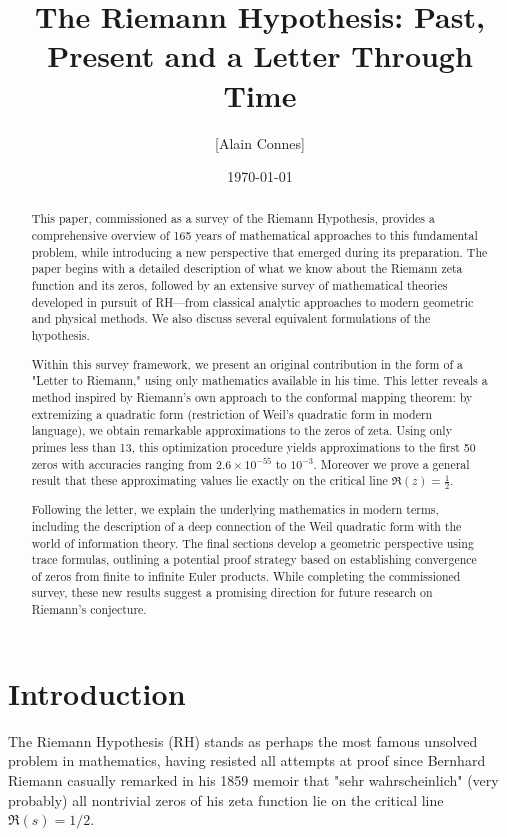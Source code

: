 \documentclass{article}
\title{The Riemann Hypothesis: Past, Present and a Letter Through Time}
\author{[Alain Connes] }
\date{\today}
\begin{document}
\maketitle

\begin{abstract}
This paper, commissioned as a survey of the Riemann Hypothesis, provides a comprehensive overview of 165 years of mathematical approaches to this fundamental problem, while introducing a new perspective that emerged during its preparation. 
The paper begins with a detailed description of what we know about the Riemann zeta function and its zeros, followed by an extensive survey of mathematical theories developed in pursuit of RH—from classical analytic approaches to modern geometric and physical methods. We also discuss several equivalent formulations of the hypothesis.

Within this survey framework, we present an original contribution in the form of a "Letter to Riemann," using only mathematics available in his time. This letter reveals a method inspired by Riemann's own approach to the conformal mapping theorem: by extremizing a quadratic form (restriction of Weil's quadratic form in modern language), we obtain remarkable approximations to the zeros of zeta. Using only primes less than 13, this optimization procedure yields approximations to the first 50 zeros with accuracies ranging from $2.6 × 10^{-55}$ to $10^{-3}$. Moreover we prove a general result that these approximating values lie exactly on the critical line $\Re(z)=\frac 12$.

Following the letter, we explain the underlying mathematics in modern terms, including the description of a deep connection  of the Weil quadratic form  with the world of information theory. The final sections develop a geometric perspective using trace formulas, outlining a potential proof strategy based on establishing convergence of zeros from finite to infinite Euler products. While completing the commissioned survey, these new results suggest a promising direction for future research on Riemann's conjecture.
\end{abstract}
\tableofcontents

\section{Introduction}

The Riemann Hypothesis (RH) stands as perhaps the most famous unsolved problem in mathematics, having resisted all attempts at proof since Bernhard Riemann casually remarked in his 1859 memoir that "sehr wahrscheinlich" (very probably) all nontrivial zeros of his zeta function lie on the critical line $\Re(s) = 1/2$. 
\end{document}
